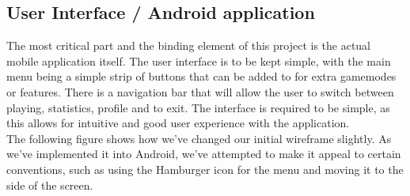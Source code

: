 \documentclass[11pt]{article}
\begin{document}

\newpage
\subsection{User Interface / Android application}

The most critical part and the binding element of this project is the actual mobile application itself. The user interface is to be kept simple, with the main menu being a simple strip of buttons that can be added to for extra gamemodes or features. There is a navigation bar that will allow the user to switch between playing, statistics, profile and to exit. 
The interface is required to be simple, as this allows for intuitive and good user experience with the application. \\

The following figure shows how we've changed our initial wireframe slightly. As we've implemented it into Android, we've attempted to make it appeal to certain conventions, such as using the Hamburger icon for the menu and moving it to the side of the screen.
\end{document}
